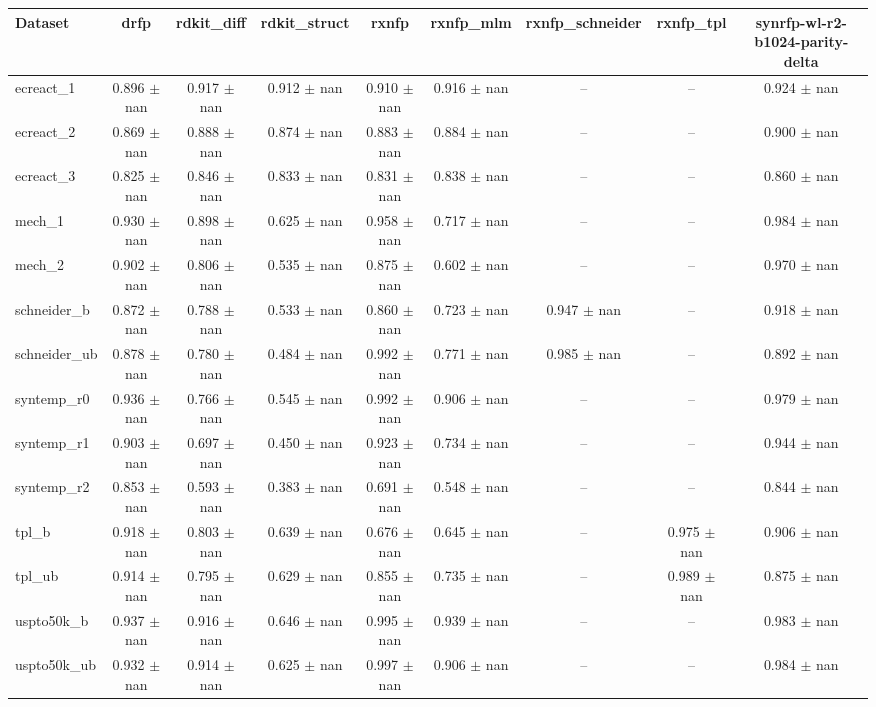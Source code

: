 \begin{tabular}{lcccccccc}
\toprule
Dataset & drfp & rdkit\_diff & rdkit\_struct & rxnfp & rxnfp\_mlm & rxnfp\_schneider & rxnfp\_tpl & synrfp-wl-r2-b1024-parity-delta \\
\midrule
ecreact\_1 & 0.896 $\pm$ nan & 0.917 $\pm$ nan & 0.912 $\pm$ nan & 0.910 $\pm$ nan & 0.916 $\pm$ nan & -- & -- & 0.924 $\pm$ nan \\
ecreact\_2 & 0.869 $\pm$ nan & 0.888 $\pm$ nan & 0.874 $\pm$ nan & 0.883 $\pm$ nan & 0.884 $\pm$ nan & -- & -- & 0.900 $\pm$ nan \\
ecreact\_3 & 0.825 $\pm$ nan & 0.846 $\pm$ nan & 0.833 $\pm$ nan & 0.831 $\pm$ nan & 0.838 $\pm$ nan & -- & -- & 0.860 $\pm$ nan \\
mech\_1 & 0.930 $\pm$ nan & 0.898 $\pm$ nan & 0.625 $\pm$ nan & 0.958 $\pm$ nan & 0.717 $\pm$ nan & -- & -- & 0.984 $\pm$ nan \\
mech\_2 & 0.902 $\pm$ nan & 0.806 $\pm$ nan & 0.535 $\pm$ nan & 0.875 $\pm$ nan & 0.602 $\pm$ nan & -- & -- & 0.970 $\pm$ nan \\
schneider\_b & 0.872 $\pm$ nan & 0.788 $\pm$ nan & 0.533 $\pm$ nan & 0.860 $\pm$ nan & 0.723 $\pm$ nan & 0.947 $\pm$ nan & -- & 0.918 $\pm$ nan \\
schneider\_ub & 0.878 $\pm$ nan & 0.780 $\pm$ nan & 0.484 $\pm$ nan & 0.992 $\pm$ nan & 0.771 $\pm$ nan & 0.985 $\pm$ nan & -- & 0.892 $\pm$ nan \\
syntemp\_r0 & 0.936 $\pm$ nan & 0.766 $\pm$ nan & 0.545 $\pm$ nan & 0.992 $\pm$ nan & 0.906 $\pm$ nan & -- & -- & 0.979 $\pm$ nan \\
syntemp\_r1 & 0.903 $\pm$ nan & 0.697 $\pm$ nan & 0.450 $\pm$ nan & 0.923 $\pm$ nan & 0.734 $\pm$ nan & -- & -- & 0.944 $\pm$ nan \\
syntemp\_r2 & 0.853 $\pm$ nan & 0.593 $\pm$ nan & 0.383 $\pm$ nan & 0.691 $\pm$ nan & 0.548 $\pm$ nan & -- & -- & 0.844 $\pm$ nan \\
tpl\_b & 0.918 $\pm$ nan & 0.803 $\pm$ nan & 0.639 $\pm$ nan & 0.676 $\pm$ nan & 0.645 $\pm$ nan & -- & 0.975 $\pm$ nan & 0.906 $\pm$ nan \\
tpl\_ub & 0.914 $\pm$ nan & 0.795 $\pm$ nan & 0.629 $\pm$ nan & 0.855 $\pm$ nan & 0.735 $\pm$ nan & -- & 0.989 $\pm$ nan & 0.875 $\pm$ nan \\
uspto50k\_b & 0.937 $\pm$ nan & 0.916 $\pm$ nan & 0.646 $\pm$ nan & 0.995 $\pm$ nan & 0.939 $\pm$ nan & -- & -- & 0.983 $\pm$ nan \\
uspto50k\_ub & 0.932 $\pm$ nan & 0.914 $\pm$ nan & 0.625 $\pm$ nan & 0.997 $\pm$ nan & 0.906 $\pm$ nan & -- & -- & 0.984 $\pm$ nan \\
\bottomrule
\end{tabular}
